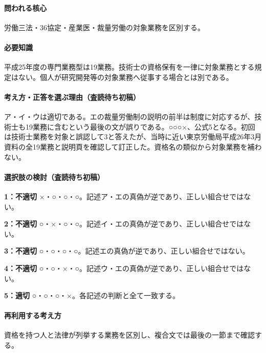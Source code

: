 \paragraph{問われる核心} 労働三法・36協定・産業医・裁量労働の対象業務を区別する。

\paragraph{必要知識} 平成25年度の専門業務型は19業務。技術士の資格保有を一律に対象業務とする規定はない。個人が研究開発等の対象業務へ従事する場合とは別である。

\paragraph{考え方・正答を選ぶ理由（査読待ち初稿）} ア・イ・ウは適切である。エの裁量労働制の説明の前半は制度に対応するが、技術士も19業務に含むという最後の文が誤りである。○○○×、公式5となる。初回は技術士業務を対象と誤認して3と答えたが、当時に近い東京労働局平成26年3月資料の全19業務と説明頁を確認して訂正した。資格名の類似から対象業務を補わない。

\paragraph{選択肢の検討（査読待ち初稿）}\mbox{}\par

\noindent\textbf{1：不適切} ×・○・○・○。記述ア・エの真偽が逆であり、正しい組合せではない。\par

\noindent\textbf{2：不適切} ○・×・○・○。記述イ・エの真偽が逆であり、正しい組合せではない。\par

\noindent\textbf{3：不適切} ○・○・○・○。記述エの真偽が逆であり、正しい組合せではない。\par

\noindent\textbf{4：不適切} ○・○・×・○。記述ウ・エの真偽が逆であり、正しい組合せではない。\par

\noindent\textbf{5：適切} ○・○・○・×。各記述の判断と全て一致する。\par

\paragraph{再利用する考え方} 資格を持つ人と法律が列挙する業務を区別し、複合文では最後の一節まで確認する。

